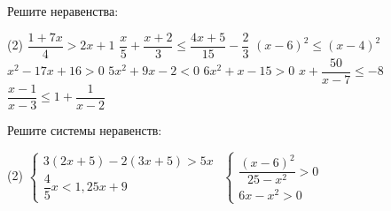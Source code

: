 \begin{homework}[number=2]
	\begin{listofex}
		\item Решите неравенства: %
		\begin{tasks}(2)
			\task \( \dfrac{ 1+7x }{4  }>2x+1 \)
			\task \( \dfrac{ x }{ 5 }+\dfrac{ x+2 }{ 3 }\le \dfrac{ 4x+5 }{ 15 }-\dfrac{ 2 }{ 3 } \)
			\task \( (x-6)^2 \le (x-4)^2 \)
			\task \( x^2-17x+16 >0 \)
			\task \( 5x^2+9x-2<0 \)
			\task \( 6x^2+x-15 > 0 \)
			\task \( x+\dfrac{ 50 }{ x-7 } \le -8 \)
			\task \( \dfrac{ x-1 }{ x-3 }  \le 1+\dfrac{1  }{ x-2 } \)
		\end{tasks}
		\item Решите системы неравенств: %
		\begin{tasks}(2)
			\task \( \begin{cases} 3(2x+5)-2(3x+5)>5x \\ \dfrac{ 4 }{ 5 }x<1,25x+9 \end{cases} \)
			\task \( \begin{cases} \dfrac{ (x-6)^2 }{ 25-x^2 } > 0 \\ 6x-x^2 > 0 \end{cases} \)
		\end{tasks}
	\end{listofex}
\end{homework}

